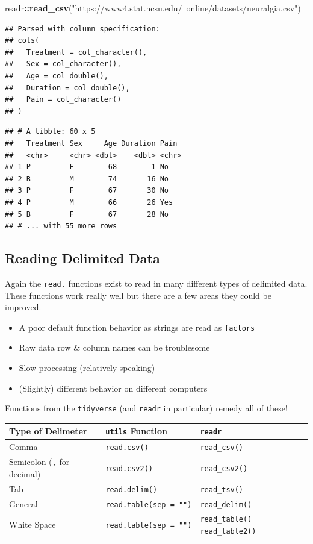 \documentclass[
]{book}
\newenvironment{Shaded}{\begin{snugshade}}{\end{snugshade}}
\newcommand{\KeywordTok}[1]{\textcolor[rgb]{0.13,0.29,0.53}{\textbf{#1}}}
\newcommand{\NormalTok}[1]{#1}
\newcommand{\OperatorTok}[1]{\textcolor[rgb]{0.81,0.36,0.00}{\textbf{#1}}}
\newcommand{\StringTok}[1]{\textcolor[rgb]{0.31,0.60,0.02}{#1}}
\theoremstyle{definition}
\theoremstyle{definition}
\theoremstyle{definition}
\theoremstyle{remark}
\begin{document}
\begin{Shaded}
\begin{Highlighting}[]
\NormalTok{readr}\OperatorTok{::}\KeywordTok{read_csv}\NormalTok{(}\StringTok{"https://www4.stat.ncsu.edu/~online/datasets/neuralgia.csv"}\NormalTok{)}
\end{Highlighting}
\end{Shaded}

\begin{verbatim}
## Parsed with column specification:
## cols(
##   Treatment = col_character(),
##   Sex = col_character(),
##   Age = col_double(),
##   Duration = col_double(),
##   Pain = col_character()
## )
\end{verbatim}

\begin{verbatim}
## # A tibble: 60 x 5
##   Treatment Sex     Age Duration Pain 
##   <chr>     <chr> <dbl>    <dbl> <chr>
## 1 P         F        68        1 No   
## 2 B         M        74       16 No   
## 3 P         F        67       30 No   
## 4 P         M        66       26 Yes  
## 5 B         F        67       28 No   
## # ... with 55 more rows
\end{verbatim}

\hypertarget{reading-delimited-data}{%
\subsection{Reading Delimited Data}\label{reading-delimited-data}}

Again the \texttt{read.} functions exist to read in many different types of delimited data. These functions work really well but there are a few areas they could be improved.

\begin{itemize}
\item
  A poor default function behavior as strings are read as \texttt{factors}
\item
  Raw data row \& column names can be troublesome
\item
  Slow processing (relatively speaking)
\item
  (Slightly) different behavior on different computers
\end{itemize}

Functions from the \texttt{tidyverse} (and \texttt{readr} in particular) remedy all of these!

\begin{longtable}[]{@{}lll@{}}
\toprule
Type of Delimeter & \texttt{utils} Function & \texttt{readr}\tabularnewline
\midrule
\endhead
Comma & \texttt{read.csv()} & \texttt{read\_csv()}\tabularnewline
Semicolon (\texttt{,} for decimal) & \texttt{read.csv2()} & \texttt{read\_csv2()}\tabularnewline
Tab & \texttt{read.delim()} & \texttt{read\_tsv()}\tabularnewline
General & \texttt{read.table(sep\ =\ "")} & \texttt{read\_delim()}\tabularnewline
White Space & \texttt{read.table(sep\ =\ "")} & \texttt{read\_table()} \texttt{read\_table2()}\tabularnewline
\bottomrule
\end{longtable}
\end{document}
